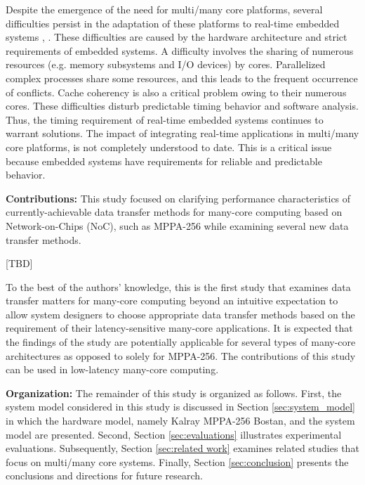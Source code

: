 \documentclass{sig-alternate-05-2015}
\begin{document}
Despite the emergence of the need for multi/many core platforms, several difficulties persist in the adaptation of these platforms to real-time embedded systems \cite{becker2016contention}, \cite{saidi2015shift}.
These difficulties are caused by the hardware architecture and strict requirements of embedded systems.
A difficulty involves the sharing of numerous resources (e.g. memory subsystems and I/O devices) by cores. Parallelized complex processes share some resources, and this leads to the frequent occurrence of conflicts.
Cache coherency is also a critical problem owing to their numerous cores.
These difficulties disturb predictable timing behavior and software analysis.
Thus, the timing requirement of real-time embedded systems continues to warrant solutions.
The impact of integrating real-time applications in multi/many core platforms, is not completely understood to date.
This is a critical issue because embedded systems have requirements for reliable and predictable behavior.

\textbf{Contributions:}
This study focused on clarifying performance characteristics of currently-achievable data transfer methods for many-core computing based on Network-on-Chips (NoC), such as MPPA-256
while examining several new data transfer methods. %

[TBD]

To the best of the authors' knowledge, this is the first study that examines data transfer matters for many-core computing beyond an intuitive expectation to allow system designers to choose appropriate data transfer methods based on the requirement of their latency-sensitive many-core applications.
It is expected that the findings of the study are potentially applicable for several types of many-core architectures as opposed to solely for MPPA-256.
The contributions of this study can be used in low-latency many-core computing.

\textbf{Organization:}
The remainder of this study is organized as follows.
First, the system model considered in this study is discussed in Section \ref{sec:system_model} in which the hardware model, namely Kalray MPPA-256 Bostan, and the system model are presented.
Second, Section \ref{sec:evaluations} illustrates experimental evaluations.
Subsequently, Section \ref{sec:related work} examines related studies that focus on multi/many core systems.
Finally, Section \ref{sec:conclusion} presents the conclusions and directions for future research.
\end{document}

